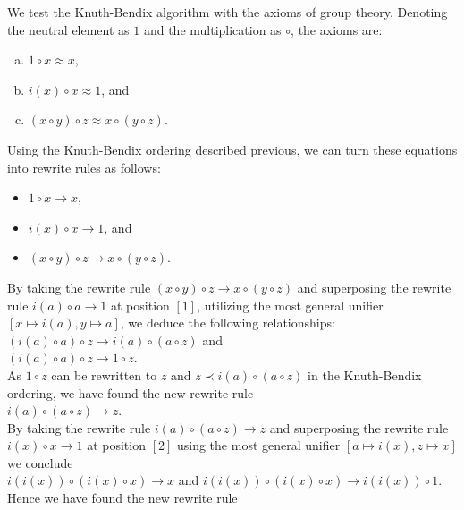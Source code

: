 \example
We test the Knuth-Bendix algorithm with the axioms of group theory.  Denoting the neutral element as $1$ and
the multiplication as $\circ$, the axioms are:
\begin{enumerate}[(a)]
\item $1 \circ x \approx x$,
\item $i(x) \circ x \approx 1$, and
\item $(x \circ y) \circ z \approx x \circ (y \circ z)$.
\end{enumerate}
Using the Knuth-Bendix ordering described previous, we can turn these equations into rewrite rules as follows: 
\begin{itemize}
\item $1 \circ x \rightarrow x$,
\item $i(x) \circ x \rightarrow 1$, and
\item $(x \circ y) \circ z \rightarrow x \circ (y \circ z)$.
\end{itemize}
By taking the rewrite rule $(x \circ y) \circ z \to x \circ (y \circ z)$ and superposing the rewrite rule
$i(a) \circ a \to 1$ at position $[1]$, utilizing the most general unifier $[x \mapsto i(a), y \mapsto a]$, we deduce 
the following relationships: 
\\[0.2cm]
\hspace*{1.3cm}
$(i(a) \circ a) \circ z \to i(a) \circ (a \circ z)$ \quad and \quad
\\[0.2cm]
\hspace*{1.3cm}
$(i(a) \circ a) \circ z \to 1 \circ z$.
\\[0.2cm]
As $1 \circ z$ can be rewritten to $z$ and  $z \prec i(a) \circ (a \circ z)$ in the Knuth-Bendix ordering, we have found the
new rewrite rule 
\\[0.2cm]
\hspace*{1.3cm}
$i(a) \circ (a \circ z) \rightarrow z$.
\\[0.2cm]
By taking the rewrite rule $i(a) \circ (a \circ z) \rightarrow z$ and superposing the rewrite rule  $i(x) \circ x \rightarrow 1$ at
position $[2]$ using the most general unifier $[a \mapsto i(x), z \mapsto x]$ we conclude
\\[0.2cm]
\hspace*{1.3cm}
$i(i(x)) \circ (i(x) \circ x) \rightarrow x$ \quad and \quad
$i(i(x)) \circ (i(x) \circ x) \rightarrow i(i(x)) \circ 1$. 
\\[0.2cm]
Hence we have found the new rewrite rule
\\[0.2cm]
\hspace*{1.3cm}
